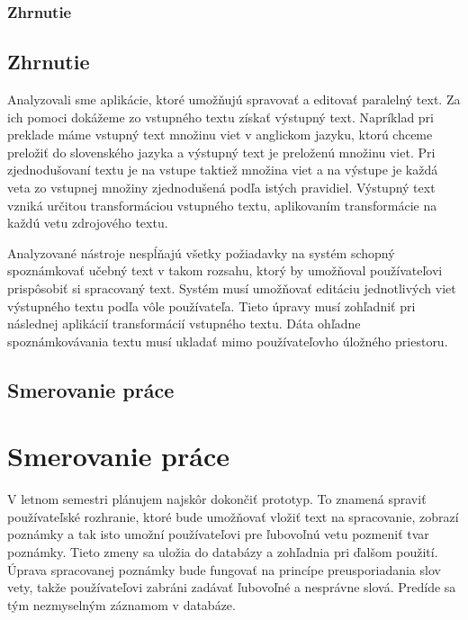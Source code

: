 %
%
{
	\subsection{Zhrnutie}
}
{
	\section{Zhrnutie}
}
Analyzovali sme aplikácie, ktoré umožňujú spravovať a editovať paralelný text. Za ich pomoci dokážeme zo vstupného textu získať výstupný text. Napríklad pri preklade máme vstupný text množinu viet v anglickom jazyku, ktorú chceme preložiť do slovenského jazyka a výstupný text je preloženú množinu viet. Pri zjednodušovaní textu je na vstupe taktiež množina viet a na výstupe je každá veta zo vstupnej množiny zjednodušená podľa istých pravidiel. Výstupný text vzniká určitou transformáciou vstupného textu, aplikovaním transformácie na každú vetu zdrojového textu.

Analyzované nástroje nespĺňajú všetky požiadavky na systém schopný spoznámkovať učebný text v takom rozsahu, ktorý by umožňoval používateľovi prispôsobiť si spracovaný text. Systém musí umožňovať editáciu jednotlivých viet výstupného textu podľa vôle používateľa. Tieto úpravy musí zohľadniť pri následnej aplikácií transformácií vstupného textu. Dáta ohľadne spoznámkovávania textu musí ukladať mimo používateľovho úložného priestoru.

%
%
{
	\section{Smerovanie práce} 
}
{
	\chapter{Smerovanie práce}
}
V letnom semestri plánujem najskôr dokončiť prototyp. To znamená spraviť používateľské rozhranie, ktoré bude umožňovať vložiť text na spracovanie, zobrazí poznámky a tak isto umožní používateľovi pre ľubovoľnú vetu pozmeniť tvar poznámky. Tieto zmeny sa uložia do databázy a zohľadnia pri ďalšom použití. Úprava spracovanej poznámky bude fungovať na princípe preusporiadania slov vety, takže používateľovi zabráni zadávať ľubovoľné a nesprávne slová. Predíde sa tým nezmyselným záznamom v databáze.

